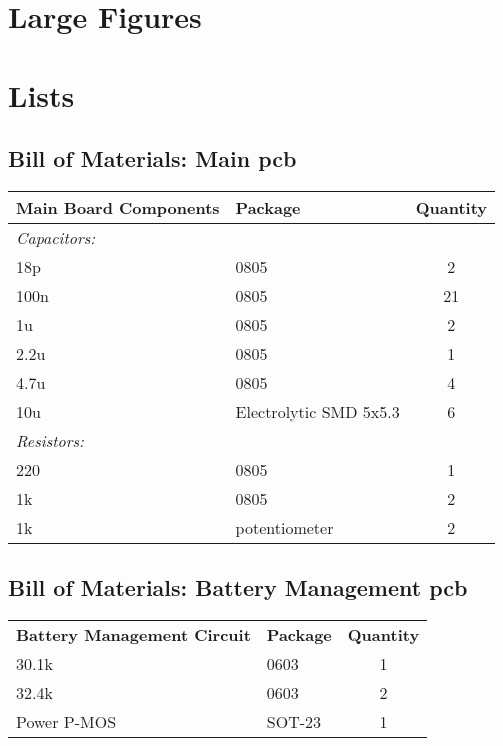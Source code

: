 \section{Large Figures}\label{sec:app}

\clearpage
\section{Lists}
\subsection{Bill of Materials: Main \gls{pcb}}
\begin{center}
\begin{tabular}{|l|l|c|}
	\hline
	\bf{Main Board Components} & \bf{Package} & \bf{Quantity} \\
	\hline
	\emph{Capacitors:} & & \\
	\hline
	18p & 0805 & 2 \\
	\hline
	100n & 0805 & 21 \\
	\hline
	1u & 0805 & 2 \\
	\hline 
	2.2u & 0805 & 1 \\
	\hline 
	4.7u & 0805 & 4 \\
	\hline 
	10u & Electrolytic SMD 5x5.3 & 6 \\
	\hline
	\emph{Resistors:} & & \\
	\hline
	220 & 0805 & 1 \\
	\hline
	1k & 0805 & 2 \\
	\hline
	1k & potentiometer & 2 \\
	\hline

\end{tabular}
\end{center}

\clearpage
\subsection{Bill of Materials: Battery Management \gls{pcb}}
\begin{tabular}{|l|l|c|}
	\hline
	\bf{Battery Management Circuit} & \bf{Package} & \bf{Quantity} \\

	30.1k & 0603 & 1 \\
	\hline
	32.4k & 0603 & 2 \\
	Power P-MOS & SOT-23 & 1 \\
	\hline
\end{tabular}
